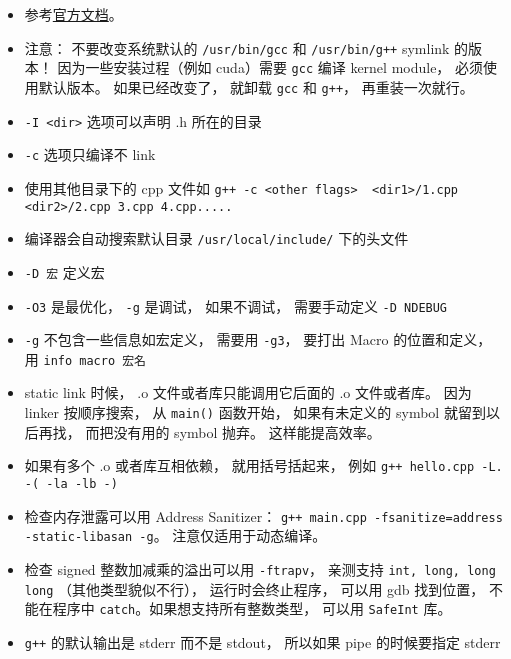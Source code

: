 
\begin{issues}
\issueDraft
\end{issues}


\begin{itemize}
\item 参考\href{https://gcc.gnu.org/onlinedocs/gcc-12.2.0/gcc/}{官方文档}。
\item 注意： 不要改变系统默认的 \verb|/usr/bin/gcc| 和 \verb|/usr/bin/g++| symlink 的版本！ 因为一些安装过程（例如 cuda）需要 \verb|gcc| 编译 kernel module， 必须使用默认版本。 如果已经改变了， 就卸载 \verb|gcc| 和 \verb|g++|， 再重装一次就行。
\item \verb|-I <dir>| 选项可以声明 .h 所在的目录
\item \verb|-c| 选项只编译不 link
\item 使用其他目录下的 cpp 文件如 \verb|g++ -c <other flags>  <dir1>/1.cpp <dir2>/2.cpp 3.cpp 4.cpp.....|
\item 编译器会自动搜索默认目录 \verb|/usr/local/include/| 下的头文件
\item \verb|-D 宏| 定义宏
\item \verb|-O3| 是最优化， \verb|-g| 是调试， 如果不调试， 需要手动定义 \verb|-D NDEBUG|
\item \verb|-g| 不包含一些信息如宏定义， 需要用 \verb|-g3|， 要打出 Macro 的位置和定义， 用 \verb|info macro 宏名|
\item static link 时候， .o 文件或者库只能调用它后面的 .o 文件或者库。 因为 linker 按顺序搜索， 从 \verb|main()| 函数开始， 如果有未定义的 symbol 就留到以后再找， 而把没有用的 symbol 抛弃。 这样能提高效率。
\item 如果有多个 .o 或者库互相依赖， 就用括号括起来， 例如 \verb|g++ hello.cpp -L. -( -la -lb -)|
\item 检查内存泄露可以用 Address Sanitizer： \verb|g++ main.cpp -fsanitize=address -static-libasan -g|。 注意仅适用于动态编译。
\item 检查 signed 整数加减乘的溢出可以用 \verb|-ftrapv|， 亲测支持 \verb|int, long, long long| （其他类型貌似不行）， 运行时会终止程序， 可以用 gdb 找到位置， 不能在程序中 \verb|catch|。如果想支持所有整数类型， 可以用 \verb|SafeInt| 库。
\item \verb|g++| 的默认输出是 stderr 而不是 stdout， 所以如果 pipe 的时候要指定 stderr
\end{itemize}

